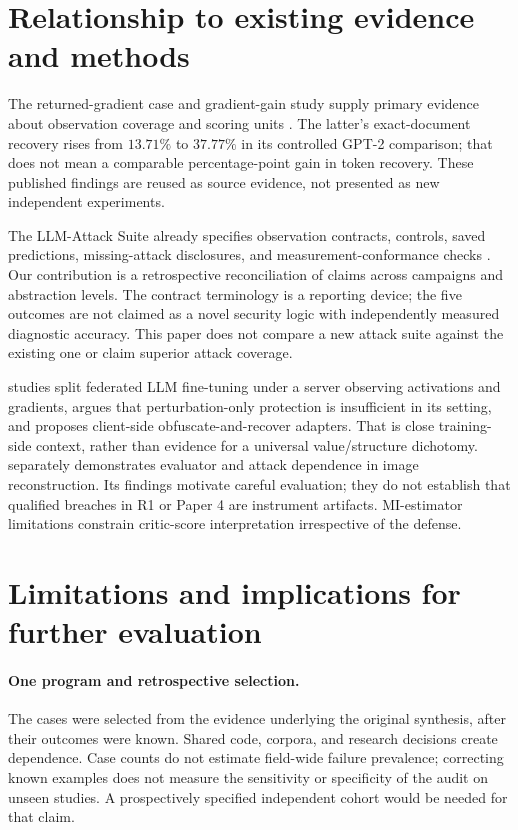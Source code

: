 \section{Relationship to existing evidence and methods}
\label{sec:related}

The returned-gradient case and gradient-gain study supply primary evidence
about observation coverage and scoring units \citep{paper1,gradients2026}.
The latter's exact-document recovery rises from $13.71\%$ to $37.77\%$
in its controlled GPT-2 comparison; that does not mean a comparable
percentage-point gain in token recovery. These published findings are
reused as source evidence, not presented as new independent experiments.

The LLM-Attack Suite already specifies observation contracts, controls,
saved predictions, missing-attack disclosures, and measurement-conformance
checks \citep{suite2026}. Our contribution is a retrospective reconciliation
of claims across campaigns and abstraction levels. The contract terminology
is a reporting device; the five outcomes are not claimed as a novel
security logic with independently measured diagnostic accuracy. This paper
does not compare a new attack suite against the existing one or claim
superior attack coverage.

\citet{privpair2026} studies split federated LLM fine-tuning under a
server observing activations and gradients, argues that perturbation-only
protection is insufficient in its setting, and proposes client-side
obfuscate-and-recover adapters. That is close training-side context,
rather than evidence for a universal value/structure dichotomy.
\citet{mia2026} separately demonstrates evaluator and attack dependence
in image reconstruction. Its findings motivate careful evaluation; they
do not establish that qualified breaches in R1 or Paper 4 are instrument
artifacts. MI-estimator limitations \citep{mcallester2020,song2020}
constrain critic-score interpretation irrespective of the defense.

\section{Limitations and implications for further evaluation}
\label{sec:limits}

\paragraph{One program and retrospective selection.}
The cases were selected from the evidence underlying the original
synthesis, after their outcomes were known. Shared code, corpora, and
research decisions create dependence. Case counts do not estimate
field-wide failure prevalence; correcting known examples does not measure
the sensitivity or specificity of the audit on unseen studies. A
prospectively specified independent cohort would be needed for that claim.

